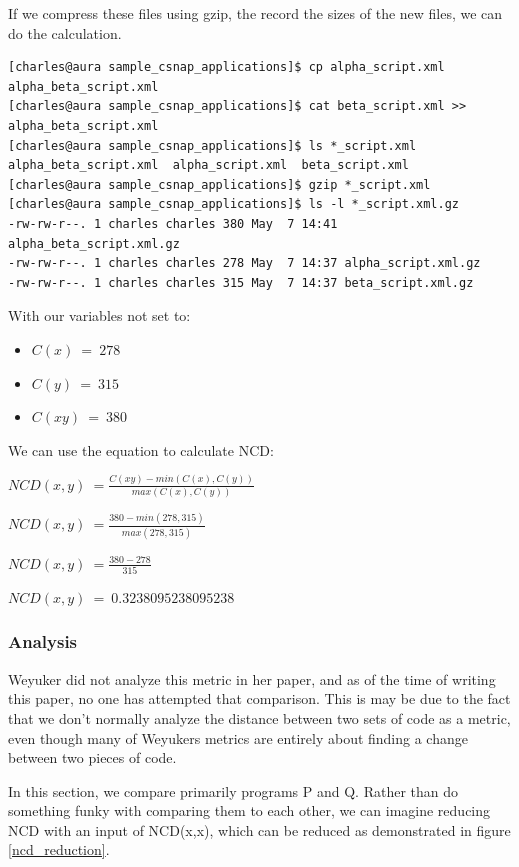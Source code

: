 \documentclass[]{article}
\begin{document}
If we compress these files using gzip, the record the sizes of the new files, we can do the calculation.

\begin{lstlisting}
[charles@aura sample_csnap_applications]$ cp alpha_script.xml alpha_beta_script.xml
[charles@aura sample_csnap_applications]$ cat beta_script.xml >> alpha_beta_script.xml
[charles@aura sample_csnap_applications]$ ls *_script.xml
alpha_beta_script.xml  alpha_script.xml  beta_script.xml
[charles@aura sample_csnap_applications]$ gzip *_script.xml
[charles@aura sample_csnap_applications]$ ls -l *_script.xml.gz
-rw-rw-r--. 1 charles charles 380 May  7 14:41 alpha_beta_script.xml.gz
-rw-rw-r--. 1 charles charles 278 May  7 14:37 alpha_script.xml.gz
-rw-rw-r--. 1 charles charles 315 May  7 14:37 beta_script.xml.gz

\end{lstlisting}

With our variables not set to:

\begin{itemize}
	\item $C(x) ~= ~278$
	\item $C(y) ~= ~315$
	\item $C(xy) ~= ~380$
\end{itemize}

We can use the equation to calculate NCD:

$NCD(x,y) ~= \frac{C(xy) - min(C(x),C(y))}{max(C(x),C(y))}$

$NCD(x,y) ~= \frac{380 - min(278,315)}{max(278,315)}$

$NCD(x,y) ~= \frac{380 - 278}{315}$

$NCD(x,y) ~= ~0.3238095238095238$

\subsubsection{Analysis}

Weyuker did not analyze this metric in her paper, and as of the time of writing this paper, no one has attempted that comparison.
This is may be due to the fact that we don't normally analyze the distance between two sets of code as a metric, even though many of Weyukers metrics are entirely about finding a change between two pieces of code.

In this section, we compare primarily programs P and Q.
Rather than do something funky with comparing them to each other, we can imagine reducing NCD with an input of NCD(x,x), which can be reduced as demonstrated in figure \ref{ncd_reduction}.
\end{document}
